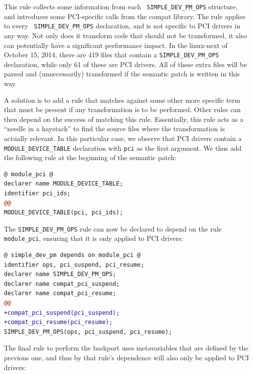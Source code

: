 
\noindent
This rule collects some information from each {\tt
  SIMPLE\_\-DEV\_\-PM\_\-OPS} structure, and introduces some PCI-specific
calls from the compat library.  The rule applies to every {\tt
  SIMPLE\_\-DEV\_\-PM\_\-OPS} declaration, and is not specific to PCI
drivers in any way.  Not only does it transform code that should not be
transformed, it also can potentially have a significant performance impact.
In the linux-next of October 15, 2014, there are 419 files that contain a
{\tt SIMPLE\_\-DEV\_\-PM\_\-OPS} declaration, while only 61 of these are
PCI drivers.  All of these extra files will be parsed and (unnecessarily)
transformed if the semantic patch is written in this way.

A solution is to add a rule that matches against some other more specific
term that must be present if any transformation is to be performed.  Other
rules can then depend on the success of matching this rule.  Essentially,
this rule acts as a ``needle in a haystack'' to find the source files
where the transformation is actually relevant.  In this particular case, we
observe that PCI drivers contain a {\tt MODULE\_\-DEVICE\_\-TABLE}
declaration with {\tt pci} as the first argument. We thus add the following
rule at the beginning of the semantic patch:

\begin{lstlisting}[language=diff]
@ module_pci @
declarer name MODULE_DEVICE_TABLE;
identifier pci_ids;
@@
MODULE_DEVICE_TABLE(pci, pci_ids);
\end{lstlisting}

The {\tt SIMPLE\_\-DEV\_\-PM\_\-OPS} rule can now be declared to depend on
the rule {\tt module\_\-pci}, ensuring that it is only applied to PCI
drivers:

\begin{lstlisting}[language=diff]
@ simple_dev_pm depends on module_pci @
identifier ops, pci_suspend, pci_resume;
declarer name SIMPLE_DEV_PM_OPS;
declarer name compat_pci_suspend;
declarer name compat_pci_resume;
@@
+compat_pci_suspend(pci_suspend);
+compat_pci_resume(pci_resume);
SIMPLE_DEV_PM_OPS(ops, pci_suspend, pci_resume);
\end{lstlisting}

The final rule to perform the backport uses metavariables that are
defined by the previous one, and thus by that rule's dependence will also
only be applied to PCI drivers:

